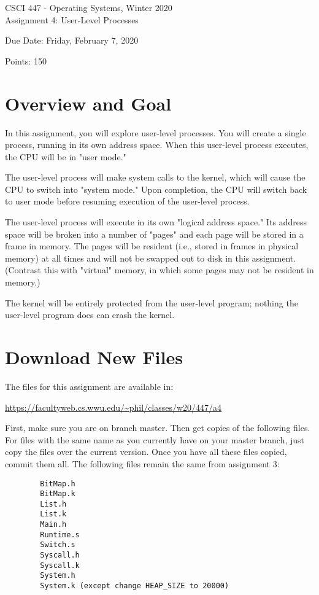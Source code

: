\documentclass[12pt]{article}
\begin{document}
\begin{center}
  \Large CSCI 447 - Operating Systems, Winter 2020 \\
  \Large Assignment 4: User-Level Processes
\end{center}

\noindent
Due Date: Friday, February 7, 2020

\noindent
Points:  150

\section{Overview and Goal}

In this assignment, you will explore user-level processes.  You will
create a single process, running in its own address space.  When this
user-level process executes, the CPU will be in "user mode."

The user-level process will make system calls to the kernel, which
will cause the CPU to switch into "system mode."  Upon completion, the
CPU will switch back to user mode before resuming execution of the
user-level process.

The user-level process will execute in its own "logical address
space."  Its address space will be broken into a number of "pages" and
each page will be stored in a frame in memory.  The pages will be
resident (i.e., stored in frames in physical memory) at all times and
will not be swapped out to disk in this assignment.  (Contrast this
with "virtual" memory, in which some pages may not be resident in
memory.)

The kernel will be entirely protected from the user-level program;
nothing the user-level program does can crash the kernel.

\section{Download New Files}

The files for this assignment are available in:

    \url{https://facultyweb.cs.wwu.edu/~phil/classes/w20/447/a4}

First, make sure you are on branch master.  Then get copies of the
following files.  For files with
the same name as you currently have on your master branch, just copy
the files over the current version.   Once you have all these files
copied, commit them all.  The following files remain the same from
assignment 3:

\begin{verbatim}
        BitMap.h
        BitMap.k
        List.h
        List.k
        Main.h
        Runtime.s
        Switch.s
        Syscall.h
        Syscall.k
        System.h
        System.k (except change HEAP_SIZE to 20000)
\end{verbatim}
\end{document}
